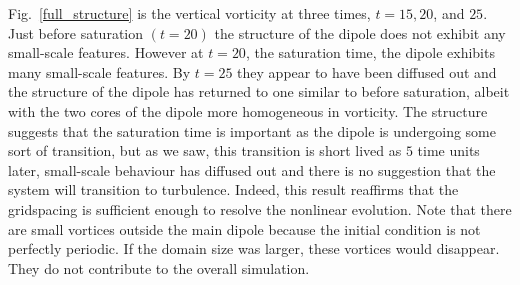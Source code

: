 Fig.~\ref{full_structure} is the vertical vorticity at three times, $t=15,20$, and $25$. Just before saturation $(t=20)$ the structure of the dipole does not exhibit any small-scale features. However at $t=20$, the saturation time, the dipole exhibits many small-scale features. By $t=25$ they appear to have been diffused out and the structure of the dipole has returned to one similar to before saturation, albeit with the two cores of the dipole more homogeneous in vorticity. The structure suggests that the saturation time is important as the dipole is undergoing some sort of transition, but as we saw, this transition is short lived as $5$ time units later, small-scale behaviour has diffused out and there is no suggestion that the system will transition to turbulence. Indeed, this result reaffirms that the gridspacing is sufficient enough to resolve the nonlinear evolution. Note that there are small vortices outside the main dipole because the initial condition is not perfectly periodic. If the domain size was larger, these vortices would disappear. They do not contribute to the overall simulation.

